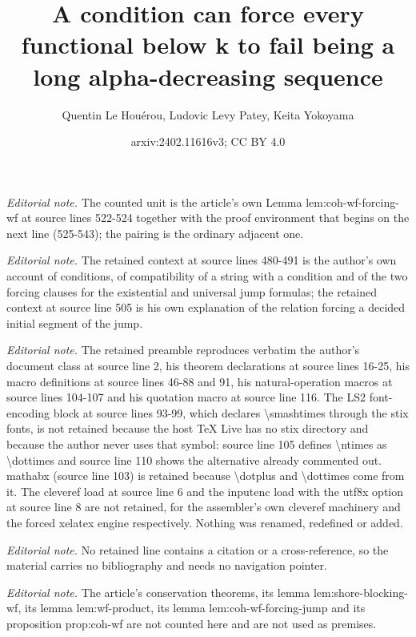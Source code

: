 \documentclass{article}
\title{A condition can force every functional below k to fail being a long alpha-decreasing sequence}
\author{Quentin Le Houérou, Ludovic Levy Patey, Keita Yokoyama}
\date{arxiv:2402.11616v3; CC BY 4.0}
\numberwithin{theorem}{section}
\begin{document}
\maketitle
\noindent\textit{Editorial note.} The counted unit is the article's own Lemma lem:coh-wf-forcing-wf at source lines 522-524 together with the proof environment that begins on the next line (525-543); the pairing is the ordinary adjacent one.\par\medskip
\noindent\textit{Editorial note.} The retained context at source lines 480-491 is the author's own account of conditions, of compatibility of a string with a condition and of the two forcing clauses for the existential and universal jump formulas; the retained context at source line 505 is his own explanation of the relation forcing a decided initial segment of the jump.\par\medskip
\noindent\textit{Editorial note.} The retained preamble reproduces verbatim the author's document class at source line 2, his theorem declarations at source lines 16-25, his macro definitions at source lines 46-88 and 91, his natural-operation macros at source lines 104-107 and his quotation macro at source line 116. The LS2 font-encoding block at source lines 93-99, which declares \textbackslash{}smashtimes through the stix fonts, is not retained because the host TeX Live has no stix directory and because the author never uses that symbol: source line 105 defines \textbackslash{}ntimes as \textbackslash{}dottimes and source line 110 shows the alternative already commented out. mathabx (source line 103) is retained because \textbackslash{}dotplus and \textbackslash{}dottimes come from it. The cleveref load at source line 6 and the inputenc load with the utf8x option at source line 8 are not retained, for the assembler's own cleveref machinery and the forced xelatex engine respectively. Nothing was renamed, redefined or added.\par\medskip
\noindent\textit{Editorial note.} No retained line contains a citation or a cross-reference, so the material carries no bibliography and needs no navigation pointer.\par\medskip
\noindent\textit{Editorial note.} The article's conservation theorems, its lemma lem:shore-blocking-wf, its lemma lem:wf-product, its lemma lem:coh-wf-forcing-jump and its proposition prop:coh-wf are not counted here and are not used as premises.\par\medskip
\end{document}
